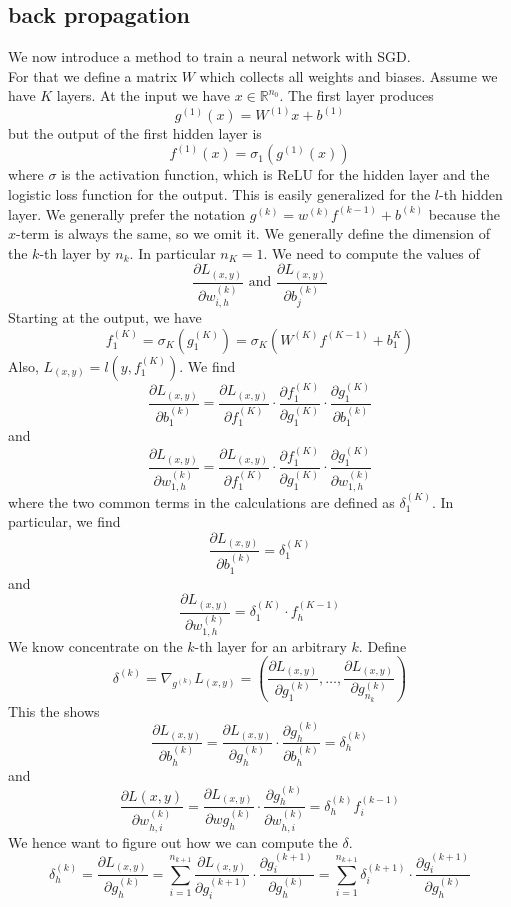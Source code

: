 \documentclass[a4paper, 12pt]{article}
\theoremstyle{plain}
\theoremstyle{definition}
\theoremstyle{lemma}
\theoremstyle{remark}
\theoremstyle{example}
\begin{document}
	\subsection{back propagation}
	We now introduce a method to train a neural network with SGD.\\
	For that we define a matrix $W$ which collects all weights and biases. Assume we have $K$ layers. At the input we have $x \in \mathbb{R}^{n_0}$. The first layer produces \[g^{(1)}(x) = W^{(1)}x+b^{(1)}\] but the output of the first hidden layer is \[f^{(1)}(x) = \sigma_1(g^{(1)}(x))\] where $\sigma$ is the activation function, which is ReLU for the hidden layer and the logistic loss function for the output. This is easily generalized for the $l$-th hidden layer. We generally prefer the notation $g^{(k)} = w^{(k)}f^{(k-1)} + b^{(k)}$ because the $x$-term is always the same, so we omit it. We generally define the dimension of the $k$-th layer by $n_k$. In particular $n_K = 1$. We need to compute the values of \[\frac{\partial L_{(x,y)}}{\partial w^{(k)}_{i,h}} \text{ and } \frac{\partial L_{(x,y)}}{\partial b_j^{(k)}}\]
	Starting at the output, we have \[f_1^{(K)} = \sigma_K(g^{(K)}_1) = \sigma_K(W^{(K)}f^{(K-1)}+b_1^K)\]
	Also, $L_{(x,y)} = l(y,f_1^{(K)})$. We find \[\frac{\partial L_{(x,y)}}{\partial b_1^{(k)}} = \frac{\partial L_{(x,y)}}{\partial f_1^{(K)}} \cdot \frac{\partial f_1^{(K)}}{\partial g_1^{(K)}}\cdot \frac{\partial g_1^{(K)}}{\partial b_1^{(k)}}\] and \[\frac{\partial L_{(x,y)}}{\partial w^{(k)}_{1,h}} = \frac{\partial L_{(x,y)}}{\partial f_1^{(K)}} \cdot \frac{\partial f_1^{(K)}}{\partial g_1^{(K)}}\cdot \frac{\partial g_1^{(K)}}{\partial w^{(k)}_{1,h}}\] where the two common terms in the calculations are defined as $\delta_1^{(K)}$. In particular, we find \[\frac{\partial L_{(x,y)}}{\partial b_1^{(k)}} = \delta_1^{(K)}\] and \[\frac{\partial L_{(x,y)}}{\partial w^{(k)}_{1,h}} = \delta_1^{(K)}\cdot f_h^{(K-1)}\]
	We know concentrate on the $k$-th layer for an arbitrary $k$. Define $$\delta^{(k)} = \nabla_{g^{(k)}} L_{(x,y)} = \left(\frac{\partial L_{(x,y)}}{\partial g_1^{(k)}}, \dots , \frac{\partial L_{(x,y)}}{\partial g_{n_k}^{(k)}}\right)$$
	This the shows \[\frac{\partial L_{(x,y)}}{\partial b_h^{(k)}} = \frac{\partial L_{(x,y)}}{\partial g_h^{(k)}}\cdot \frac{\partial g_h^{(k)}}{\partial b_h^{(k)}} = \delta_h^{(k)}\] and \[\frac{\partial L{(x,y)}}{\partial w_{h,i}^{(k)}} = \frac{\partial L_{(x,y)}}{\partial wg_h^{(k)}} \cdot \frac{\partial g_h^{(k)}}{\partial w_{h,i}^{(k)}} = \delta_h^{(k)}f_i^{(k-1)}\]
	We hence want to figure out how we can compute the $\delta$. \[\delta_h^{(k)} = \frac{\partial L_{(x,y)}}{\partial g_h^{(k)}} = \sum_{i=1}^{n_{k+1}}\frac{\partial L_{(x,y)}}{\partial g_i^{(k+1)}}\cdot \frac{\partial g_i^{(k+1)}}{\partial g_h^{(k)}} = \sum_{i=1}^{n_{k+1}} \delta_i^{(k+1)}\cdot \frac{\partial g_i^{(k+1)}}{\partial g_h^{(k)}}\]
\end{document}
